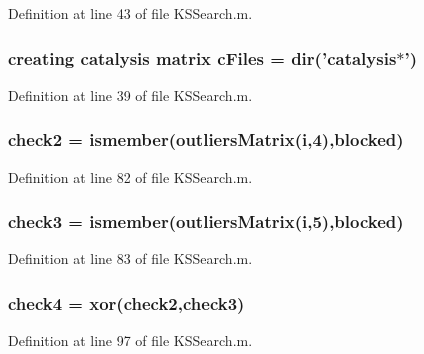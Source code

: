 Definition at line 43 of file K\-S\-Search.\-m.

\hypertarget{a00024_a9eab57ccb42a39c704f47dc30e4f4515}{
\subsubsection[{c\-Files}]{\setlength{\rightskip}{0pt plus 5cm}creating {\bf catalysis} matrix c\-Files = {\bf dir}('{\bf catalysis}$\ast$')}}\label{a00024_a9eab57ccb42a39c704f47dc30e4f4515}


Definition at line 39 of file K\-S\-Search.\-m.

\hypertarget{a00024_a98a8838a85ed24032563a44271b1525a}{
\subsubsection[{check2}]{\setlength{\rightskip}{0pt plus 5cm}check2 = ismember({\bf outliers\-Matrix}({\bf i},4),{\bf blocked})}}\label{a00024_a98a8838a85ed24032563a44271b1525a}


Definition at line 82 of file K\-S\-Search.\-m.

\hypertarget{a00024_adfd17509248a56986475a25ee50fe488}{
\subsubsection[{check3}]{\setlength{\rightskip}{0pt plus 5cm}check3 = ismember({\bf outliers\-Matrix}({\bf i},5),{\bf blocked})}}\label{a00024_adfd17509248a56986475a25ee50fe488}


Definition at line 83 of file K\-S\-Search.\-m.

\hypertarget{a00024_ab21c5bac10f7ac73374c002e908df5ac}{
\subsubsection[{check4}]{\setlength{\rightskip}{0pt plus 5cm}check4 = xor({\bf check2},{\bf check3})}}\label{a00024_ab21c5bac10f7ac73374c002e908df5ac}


Definition at line 97 of file K\-S\-Search.\-m.

